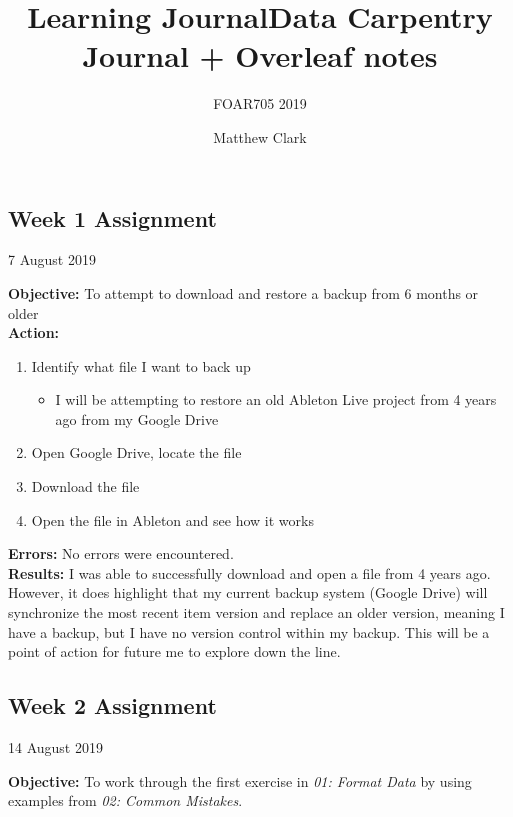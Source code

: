 \documentclass{article}
\title{Learning Journal}
\subtitle{FOAR705 2019}
\author{Matthew Clark}
\date{\vspace{-5ex}} %
\begin{document}
\maketitle
\newpage
\tableofcontents
\newpage
\title{Data Carpentry Journal + Overleaf notes}
\maketitle
\newpage
\begin{center}
\section{Week 1 Assignment}
7 August 2019
\end{center}
\noindent
\textbf{Objective:} To attempt to download and restore a backup from 6 months or older\\
\textbf{Action:}
\begin{enumerate}
    \item Identify what file I want to back up
    \begin{itemize}
        \item I will be attempting to restore an old Ableton Live project from 4 years ago from my Google Drive
    \end{itemize}
    \item Open Google Drive, locate the file
    \item Download the file
    \item Open the file in Ableton and see how it works
\end{enumerate}
\textbf{Errors:} No errors were encountered. \\
\textbf{Results:} I was able to successfully download and open a file from 4 years ago. However, it does highlight that my current backup system (Google Drive) will synchronize the most recent item version and replace an older version, meaning I have a backup, but I have no version control within my backup. This will be a point of action for future me to explore down the line.
\newpage
\begin{center}
\section{Week 2 Assignment}
14 August 2019
\end{center}
\noindent
\textbf{Objective:} To work through the first exercise in \textit{01: Format Data} by using examples from \textit{02: Common Mistakes}.
\end{document}
